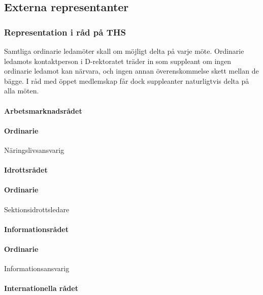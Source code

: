 \documentclass[a4paper,12pt]{article}
\begin{document}
\subsection{Externa representanter}

\subsubsection{Representation i råd på THS}

Samtliga ordinarie ledamöter skall om möjligt delta på varje möte. Ordinarie ledamots kontaktperson i D-rektoratet träder in som suppleant om ingen ordinarie ledamot kan närvara, och ingen annan överenskommelse skett mellan de bägge. I råd med öppet medlemskap får dock suppleanter naturligtvis delta på alla möten.

\paragraph{Arbetsmarknadsrådet}

\paragraph{Ordinarie}

Näringslivsansvarig

\paragraph{Idrottsrådet}

\paragraph{Ordinarie}

Sektionsidrottsledare

\paragraph{Informationsrådet}

\paragraph{Ordinarie}

Informationsansvarig

\paragraph{Internationella rådet}
\end{document}

